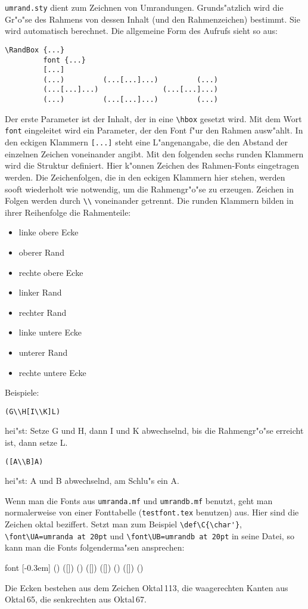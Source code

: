 \verb|umrand.sty| dient zum Zeichnen von Umrandungen. Grunds"atzlich wird die
Gr"o"se des Rahmens von dessen Inhalt (und den Rahmenzeichen) bestimmt. Sie
wird automatisch berechnet. Die allgemeine Form des Aufrufs sieht so aus:
\begin{verbatim}
\RandBox {...}
         font {...}
         [...]
         (...)         (...[...]...)         (...)
         (...[...]...)               (...[...]...)
         (...)         (...[...]...)         (...)
\end{verbatim}
Der erste Parameter ist der Inhalt, der in eine \verb|\hbox| gesetzt wird. Mit
dem Wort \verb|font| eingeleitet wird ein Parameter, der den Font f"ur den
Rahmen ausw"ahlt. In den eckigen Klammern \verb|[...]| steht eine L"angenangabe,
die den Abstand der einzelnen Zeichen voneinander angibt. Mit den folgenden
sechs runden Klammern wird die Struktur definiert. Hier k"onnen Zeichen des
Rahmen-Fonts eingetragen werden. Die Zeichenfolgen, die in den eckigen
Klammern hier stehen, werden sooft wiederholt wie notwendig, um die
Rahmengr"o"se zu erzeugen. Zeichen in Folgen werden durch \verb|\\| voneinander
getrennt. Die runden Klammern bilden in ihrer Reihenfolge die Rahmenteile:
\begin{itemize}
\item linke obere Ecke
\item oberer Rand
\item rechte obere Ecke
\item linker Rand
\item rechter Rand
\item linke untere Ecke
\item unterer Rand
\item rechte untere Ecke
\end{itemize}
Beispiele:
\begin{verbatim}
(G\\H[I\\K]L)
\end{verbatim}
hei"st: Setze G und H, dann I und K abwechselnd, bis die Rahmengr"o"se
erreicht ist, dann setze L.
\begin{verbatim}
([A\\B]A)
\end{verbatim}
hei"st: A und B abwechselnd, am Schlu"s ein A.

Wenn man die Fonts aus \verb|umranda.mf| und \verb|umrandb.mf| benutzt,
geht man normalerweise von einer Fonttabelle (\verb|testfont.tex|
benutzen) aus. Hier sind die Zeichen oktal beziffert. Setzt man zum
Beispiel \verb|\def\C{\char'}|, \verb|\font\UA=umranda at 20pt| und
\verb|\font\UB=umrandb at 20pt| in seine Datei, so kann man die Fonts
folgenderma"sen ansprechen:
\begin{bsp}
 font {\UA} [-0.3em]
         ()  ([]) ()
         ([])          ([])
         ()  ([]) ()
\end{bsp}
\make
Die Ecken bestehen aus dem Zeichen Oktal\,113, die waagerechten Kanten aus
Oktal\,65, die senkrechten aus Oktal\,67.

